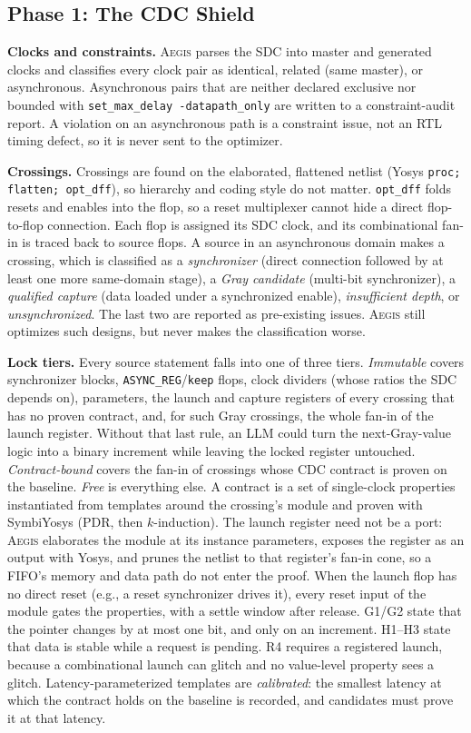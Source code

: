 \documentclass[conference,10pt]{IEEEtran}
\newcommand{\aegis}{\textsc{Aegis}}
\begin{document}
\subsection{Phase 1: The CDC Shield}
\label{sec:phase1}

\textbf{Clocks and constraints.} \aegis{} parses the SDC into master and generated clocks and classifies every
clock pair as identical, related (same master), or asynchronous. Asynchronous pairs that are neither declared
exclusive nor bounded with \texttt{set\_max\_delay -datapath\_only} are written to a constraint-audit report. A
violation on an asynchronous path is a constraint issue, not an RTL timing defect, so it is never sent to the
optimizer.

\textbf{Crossings.} Crossings are found on the elaborated, flattened netlist (Yosys \texttt{proc; flatten;
opt\_dff}), so hierarchy and coding style do not matter. \texttt{opt\_dff} folds resets and enables into the flop,
so a reset multiplexer cannot hide a direct flop-to-flop connection. Each flop is assigned its SDC clock, and its
combinational fan-in is traced back to source flops. A source in an asynchronous domain makes a crossing, which is
classified as a \emph{synchronizer} (direct connection followed by at least one more same-domain stage), a
\emph{Gray candidate} (multi-bit synchronizer), a \emph{qualified capture} (data loaded under a synchronized
enable), \emph{insufficient depth}, or \emph{unsynchronized}. The last two are reported as pre-existing issues.
\aegis{} still optimizes such designs, but never makes the classification worse.

\textbf{Lock tiers.} Every source statement falls into one of three tiers.
\emph{Immutable} covers synchronizer blocks, \texttt{ASYNC\_REG}/\texttt{keep} flops, clock dividers (whose ratios
the SDC depends on), parameters, the launch and capture registers of every crossing that has no proven contract,
and, for such Gray crossings, the whole fan-in of the launch register. Without that last rule, an LLM could turn the
next-Gray-value logic into a binary increment while leaving the locked register untouched.
\emph{Contract-bound} covers the fan-in of crossings whose CDC contract is proven on the baseline.
\emph{Free} is everything else. A contract is a set of single-clock properties instantiated from templates around
the crossing's module and proven with SymbiYosys (PDR, then $k$-induction). The launch register need not be a port:
\aegis{} elaborates the module at its instance parameters, exposes the register as an output with Yosys, and prunes
the netlist to that register's fan-in cone, so a FIFO's memory and data path do not enter the proof. When the launch
flop has no direct reset (e.g., a reset synchronizer drives it), every reset input of the module gates the
properties, with a settle window after release. G1/G2 state that the pointer changes
by at most one bit, and only on an increment. H1--H3 state that data is stable while a request is pending. R4
requires a registered launch, because a combinational launch can glitch and no value-level property sees a glitch.
Latency-parameterized templates are \emph{calibrated}: the smallest latency at which the contract holds on the
baseline is recorded, and candidates must prove it at that latency.
\end{document}
